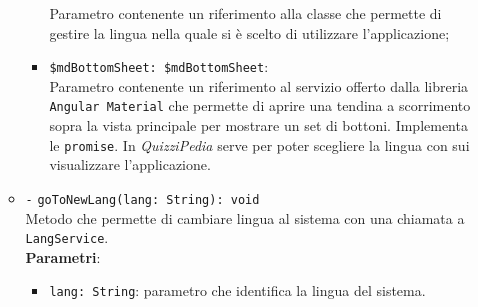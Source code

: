 \begin{itemize}
\begin{itemize}
\begin{itemize}
			Parametro contenente un riferimento alla classe che permette di gestire la lingua nella quale si è scelto di utilizzare l'applicazione;
			\item \texttt{\$mdBottomSheet: \$mdBottomSheet}: \\
			Parametro contenente un riferimento al servizio offerto dalla libreria \texttt{Angular Material} che permette di aprire una tendina a scorrimento sopra la vista principale per mostrare un set di bottoni. Implementa le \texttt{promise}. In \textit{QuizziPedia} serve per poter scegliere la lingua con sui visualizzare l'applicazione.
		\end{itemize}
		\item \texttt{-} \texttt{goToNewLang(lang: String): void} \\ Metodo che permette di cambiare lingua al sistema con una chiamata a \texttt{LangService}.\\
		\textbf{Parametri}:
		\begin{itemize}
			\item \texttt{lang: String}: parametro che identifica la lingua del sistema.
		\end{itemize}
	
	\end{itemize}
\end{itemize}

